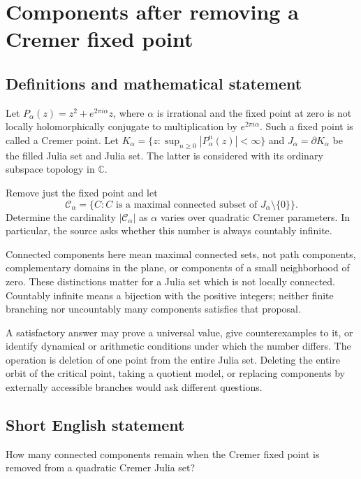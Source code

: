 \documentclass[11pt,a4paper]{article}
\begin{document}
\section*{Components after removing a Cremer fixed point}\label{statement}

\subsection{Definitions and mathematical statement}
Let $P_\alpha(z)=z^2+e^{2\pi i\alpha}z$, where $\alpha$ is irrational
and the fixed point at zero is not locally holomorphically conjugate
to multiplication by $e^{2\pi i\alpha}$. Such a fixed point is called
a Cremer point. Let
$K_\alpha=\{z:\sup_{n\ge0}|P_\alpha^n(z)|<\infty\}$ and
$J_\alpha=\partial K_\alpha$ be the filled Julia set and Julia set.
The latter is considered with its ordinary subspace topology in
$\mathbb C$.

Remove just the fixed point and let
\[
 \mathcal C_\alpha=\{C:C\text{ is a maximal connected subset of }
                                  J_\alpha\setminus\{0\}\}.
\]
Determine the cardinality $|\mathcal C_\alpha|$ as $\alpha$ varies over
quadratic Cremer parameters. In particular, the source asks whether
this number is always countably infinite.

Connected components here mean maximal connected sets, not path
components, complementary domains in the plane, or components of a
small neighborhood of zero. These distinctions matter for a Julia set
which is not locally connected. Countably infinite means a bijection
with the positive integers; neither finite branching nor uncountably
many components satisfies that proposal.

A satisfactory answer may prove a universal value, give counterexamples
to it, or identify dynamical or arithmetic conditions under which the
number differs. The operation is deletion of one point from the entire
Julia set. Deleting the entire orbit of the critical point, taking a
quotient model, or replacing components by externally accessible
branches would ask different questions.
\subsection{Short English statement}
How many connected components remain when the Cremer fixed point is removed from a quadratic Cremer Julia set?
\end{document}
